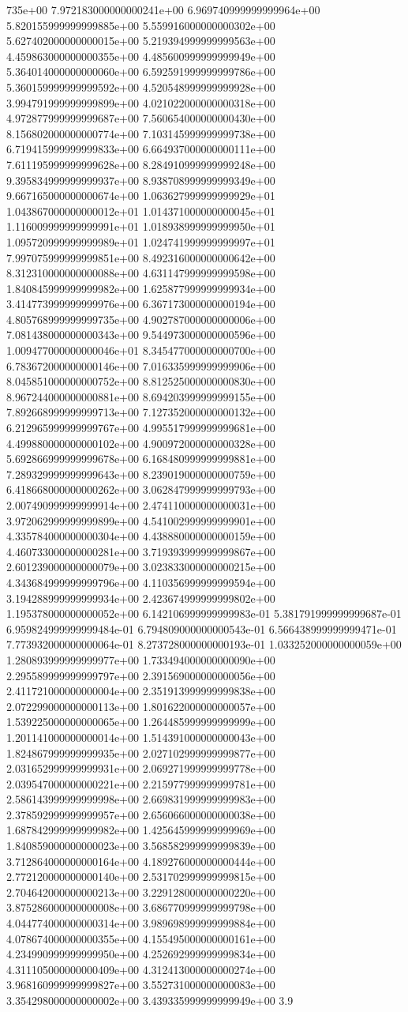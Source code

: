 735e+00	7.972183000000000241e+00	6.969740999999999964e+00	5.820155999999999885e+00	5.559916000000000302e+00	5.627402000000000015e+00	5.219394999999999563e+00	4.459863000000000355e+00	4.485600999999999949e+00	5.364014000000000060e+00	6.592591999999999786e+00	5.360159999999999592e+00	4.520548999999999928e+00	3.994791999999999899e+00	4.021022000000000318e+00	4.972877999999999687e+00	7.560654000000000430e+00	8.156802000000000774e+00	7.103145999999999738e+00	6.719415999999999833e+00	6.664937000000000111e+00	7.611195999999999628e+00	8.284910999999999248e+00	9.395834999999999937e+00	8.938708999999999349e+00	9.667165000000000674e+00	1.063627999999999929e+01	1.043867000000000012e+01	1.014371000000000045e+01	1.116009999999999991e+01	1.018938999999999950e+01	1.095720999999999989e+01	1.024741999999999997e+01	7.997075999999999851e+00	8.492316000000000642e+00	8.312310000000000088e+00	4.631147999999999598e+00	1.840845999999999982e+00	1.625877999999999934e+00	3.414773999999999976e+00	6.367173000000000194e+00	4.805768999999999735e+00	4.902787000000000006e+00	7.081438000000000343e+00	9.544973000000000596e+00	1.009477000000000046e+01	8.345477000000000700e+00	6.783672000000000146e+00	7.016335999999999906e+00	8.045851000000000752e+00	8.812525000000000830e+00	8.967244000000000881e+00	8.694203999999999155e+00	7.892668999999999713e+00	7.127352000000000132e+00	6.212965999999999767e+00	4.995517999999999681e+00	4.499880000000000102e+00	4.900972000000000328e+00	5.692866999999999678e+00	6.168480999999999881e+00	7.289329999999999643e+00	8.239019000000000759e+00	6.418668000000000262e+00	3.062847999999999793e+00	2.007490999999999914e+00	2.474110000000000031e+00	3.972062999999999899e+00	4.541002999999999901e+00	4.335784000000000304e+00	4.438880000000000159e+00	4.460733000000000281e+00	3.719393999999999867e+00	2.601239000000000079e+00	3.023833000000000215e+00	4.343684999999999796e+00	4.110356999999999594e+00	3.194288999999999934e+00	2.423674999999999802e+00	1.195378000000000052e+00	6.142106999999999983e-01	5.381791999999999687e-01	6.959824999999999484e-01	6.794809000000000543e-01	6.566438999999999471e-01	7.773932000000000064e-01	8.273728000000000193e-01	1.033252000000000059e+00	1.280893999999999977e+00	1.733494000000000090e+00	2.295589999999999797e+00	2.391569000000000056e+00	2.411721000000000004e+00	2.351913999999999838e+00	2.072299000000000113e+00	1.801622000000000057e+00	1.539225000000000065e+00	1.264485999999999999e+00	1.201141000000000014e+00	1.514391000000000043e+00	1.824867999999999935e+00	2.027102999999999877e+00	2.031652999999999931e+00	2.069271999999999778e+00	2.039547000000000221e+00	2.215977999999999781e+00	2.586143999999999998e+00	2.669831999999999983e+00	2.378592999999999957e+00	2.656066000000000038e+00	1.687842999999999982e+00	1.425645999999999969e+00	1.840859000000000023e+00	3.568582999999999839e+00	3.712864000000000164e+00	4.189276000000000444e+00	2.772120000000000140e+00	2.531702999999999815e+00	2.704642000000000213e+00	3.229128000000000220e+00	3.875286000000000008e+00	3.686770999999999798e+00	4.044774000000000314e+00	3.989698999999999884e+00	4.078674000000000355e+00	4.155495000000000161e+00	4.234990999999999950e+00	4.252692999999999834e+00	4.311105000000000409e+00	4.312413000000000274e+00	3.968160999999999827e+00	3.552731000000000083e+00	3.354298000000000002e+00	3.439335999999999949e+00	3.9